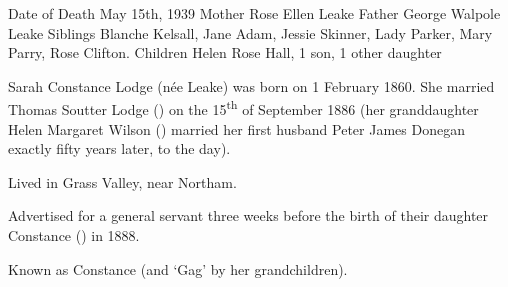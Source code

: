 
Date of Death 	May 15th, 1939
Mother 	Rose Ellen Leake
Father 	George Walpole Leake
Siblings 	Blanche Kelsall, Jane Adam, Jessie Skinner, Lady Parker, Mary Parry, Rose Clifton.
Children 	Helen Rose Hall, 1 son, 1 other daughter

Sarah Constance Lodge (n\'{e}e Leake) was born on 1 February 1860. She married Thomas Soutter Lodge () on the 15\textsuperscript{th} of September 1886 (her granddaughter Helen Margaret Wilson () married her first husband Peter James Donegan exactly fifty years later, to the day\cite{HMWnote}).

Lived in Grass Valley, near Northam.\cite{ServantAd}

Advertised for a general servant three weeks before the birth of their daughter Constance () in 1888.\cite{ServantAd}

Known as Constance (and `Gag' by her grandchildren).
